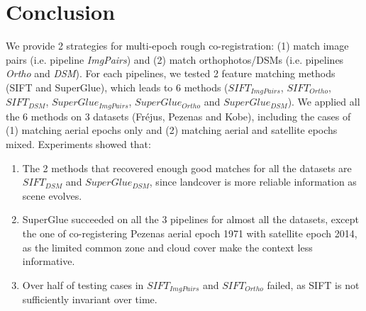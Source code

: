 \section{Conclusion}
We provide 2 strategies for multi-epoch rough co-registration: (1) match image pairs (i.e. pipeline \textit{ImgPairs}) and (2) match orthophotos/DSMs (i.e. pipelines \textit{Ortho} and \textit{DSM}).
For each pipelines, we tested 2 feature matching methods (SIFT and SuperGlue), which leads to 6 methods ($SIFT_{ImgPairs}$, $SIFT_{Ortho}$, $SIFT_{DSM}$, $SuperGlue_{ImgPairs}$, $SuperGlue_{Ortho}$ and $SuperGlue_{DSM}$).
We applied all the 6 methods on 3 datasets (Fr{\'e}jus, Pezenas and Kobe), including the cases of (1) matching aerial epochs only and (2) matching aerial and satellite epochs mixed.
Experiments showed that:\\
\begin{enumerate}
	\item The 2 methods that recovered enough good matches for all the datasets are $SIFT_{DSM}$ and $SuperGlue_{DSM}$, since landcover is more reliable information as scene evolves.
	\item SuperGlue succeeded on all the 3 pipelines for almost all the datasets, except the one of co-registering Pezenas aerial epoch 1971 with satellite epoch 2014, as the limited common zone and cloud cover make the context less informative.
	\item Over half of testing cases in $SIFT_{ImgPairs}$ and $SIFT_{Ortho}$ failed, as SIFT is not sufficiently invariant over time. 
\end{enumerate}

